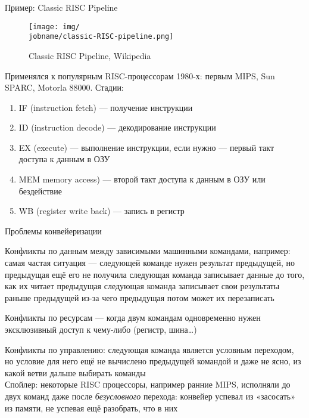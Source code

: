 \documentclass[xetex,aspectratio=43]{beamer}
\begin{document}
\begin{frame}{Пример: Classic RISC Pipeline}
    \begin{figure}
        \texttt{[image: img/\\jobname/classic-RISC-pipeline.png]}
        \caption{Classic RISC Pipeline, Wikipedia}
    \end{figure}
    Применялся к популярным RISC-процессорам 1980-х: первым MIPS, Sun SPARC, Motorla 88000.
    Стадии:
    \begin{enumerate}
        \tightlist
        \item IF (instruction fetch) — получение инструкции
        \item ID (instruction decode) — декодирование инструкции
        \item EX (execute) — выполнение инструкции, если нужно — первый такт доступа к данным в ОЗУ
        \item MEM memory access) — второй такт доступа к данным в ОЗУ или бездействие
        \item WB (register write back) — запись в регистр
    \end{enumerate}
\end{frame}

\begin{frame}{Проблемы конвейеризации}
    \begin{outline}[enumerate]
        \renewcommand{\outlineii}{itemize}
        \1 Конфликты по данным между зависимыми машинными командами, например:
            \2 самая частая ситуация — следующей команде нужен результат предыдущей, но предыдущая ещё его не получила
            \2 следующая команда записывает данные до того, как их читает предыдущая
            \2 следующая команда записывает свои результаты раньше предыдущей из-за чего предыдущая потом может их перезаписать

        \1 Конфликты по ресурсам — когда двум командам одновременно нужен эксклюзивный доступ к чему-либо (регистр, шина\ldots)

        \1 Конфликты по управлению: следующая команда является условным переходом, но условие для него ещё не вычислено предыдущей командой
            \2 и даже не ясно, из какой ветви дальше выбирать команды
            \pause\\
            \alert{Спойлер: некоторые RISC процессоры, например ранние MIPS, исполняли до двух команд даже после \emph{безусловного} перехода: конвейер успевал из «засосать» из памяти, не успевая ещё разобрать, что в них}
    \end{outline}
\end{frame}
\end{document}

